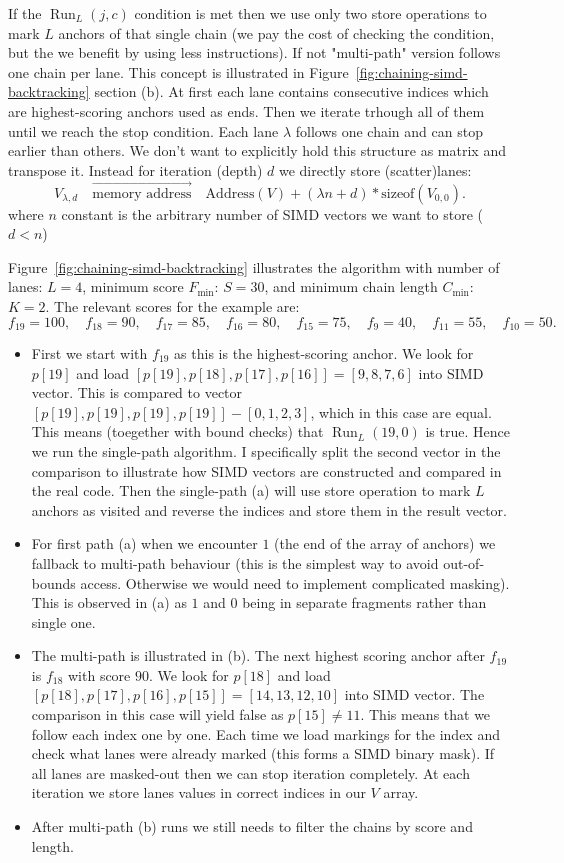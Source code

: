 If the $\operatorname{Run}_L(j,c)$ condition is met then we use only two store operations to mark $L$ anchors of that single chain (we pay the cost of checking the condition, but the we benefit by using less instructions). If not "multi-path" version follows one chain per lane. 
This concept is illustrated in Figure~\ref{fig:chaining-simd-backtracking} section (b). At first each lane contains consecutive indices which are highest-scoring anchors used as ends. Then we iterate trhough all of them until we reach the stop condition. Each lane $\lambda$ follows one chain and can stop 
earlier than others. We don't want to explicitly hold this structure as matrix and transpose it. Instead for iteration (depth) $d$ we directly store (scatter)lanes:
\[
  V_{\lambda,d}\quad\overrightarrow{\text{memory address}}\quad \text{Address}(V)+(\lambda n+d)*\text{sizeof}(V_{0,0}).
\]
where $n$ constant is the arbitrary number of SIMD vectors we want to store ($d < n$)

Figure~\ref{fig:chaining-simd-backtracking} illustrates the algorithm with
number of lanes: \(L=4\), minimum score $F_{\text{min}}$: \(S=30\), and minimum chain length $C_{\text{min}}$: \(K=2\). 
The relevant scores for the example are:
\[
  f_{19}=100,\quad f_{18}=90,\quad f_{17}=85,\quad f_{16}=80,\quad
  f_{15}=75,\quad f_9=40,\quad f_{11}=55,\quad f_{10}=50.
\]
\begin{itemize}
  \item First we start with $f_{19}$ as this is the highest-scoring anchor. We look for $p[19]$ and load $[p[19], p[18], p[17], p[16]] = [9, 8, 7, 6]$ into SIMD vector. This is compared to vector ${[p[19], p[19], p[19], p[19]] - [0, 1, 2, 3]}$, which in this case are equal. This means (toegether with bound checks) that $\operatorname{Run}_L(19,0)$ is true. Hence we run the single-path algorithm. I specifically split the second vector in the comparison to illustrate how SIMD vectors are constructed and compared in the real code. Then the single-path (a) will use store operation to mark $L$ anchors as visited and reverse the indices and store them in the result vector.
  \item For first path (a) when we encounter $1$ (the end of the array of anchors) we fallback to multi-path behaviour (this is the simplest way to avoid out-of-bounds access. Otherwise we would need to implement complicated masking). This is observed in (a) as $1$ and $0$ being in separate fragments rather than single one.
  \item The multi-path is illustrated in (b). The next highest scoring anchor after $f_{19}$ is $f_{18}$ with score $90$. We look for $p[18]$ and load $[p[18], p[17], p[16], p[15]] = [14, 13, 12, 10]$ into SIMD vector. The comparison in this case will yield false as $p[15] \neq 11$. This means that we follow each index one by one. Each time we load markings for the index and check what lanes were already marked (this forms a SIMD binary mask). If all lanes are masked-out then we can stop iteration completely. At each iteration we store lanes values in correct indices in our $V$ array.
  \item After multi-path (b) runs we still needs to filter the chains by score and length. 
\end{itemize}


